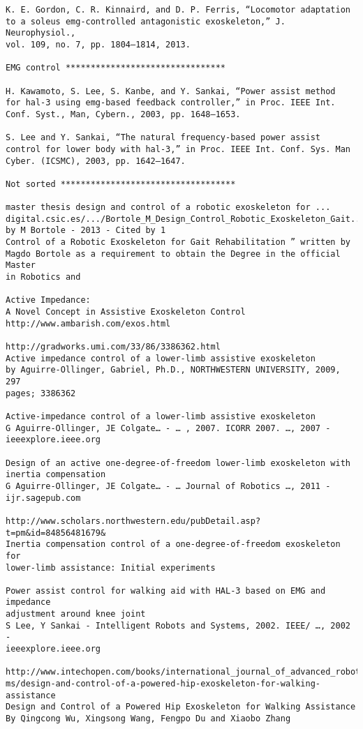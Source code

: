 \documentclass[letterpaper,12pt,fullpage]{article}
\begin{document}
\begin{verbatim}
K. E. Gordon, C. R. Kinnaird, and D. P. Ferris, “Locomotor adaptation
to a soleus emg-controlled antagonistic exoskeleton,” J. Neurophysiol.,
vol. 109, no. 7, pp. 1804–1814, 2013.

EMG control ********************************

H. Kawamoto, S. Lee, S. Kanbe, and Y. Sankai, “Power assist method
for hal-3 using emg-based feedback controller,” in Proc. IEEE Int.
Conf. Syst., Man, Cybern., 2003, pp. 1648–1653.

S. Lee and Y. Sankai, “The natural frequency-based power assist
control for lower body with hal-3,” in Proc. IEEE Int. Conf. Sys. Man
Cyber. (ICSMC), 2003, pp. 1642–1647.

Not sorted ***********************************

master thesis design and control of a robotic exoskeleton for ...
digital.csic.es/.../Bortole_M_Design_Control_Robotic_Exoskeleton_Gait...
by M Bortole - ‎2013 - ‎Cited by 1
Control of a Robotic Exoskeleton for Gait Rehabilitation ” written by
Magdo Bortole as a requirement to obtain the Degree in the official Master
in Robotics and

Active Impedance:
A Novel Concept in Assistive Exoskeleton Control
http://www.ambarish.com/exos.html

http://gradworks.umi.com/33/86/3386362.html
Active impedance control of a lower-limb assistive exoskeleton
by Aguirre-Ollinger, Gabriel, Ph.D., NORTHWESTERN UNIVERSITY, 2009, 297
pages; 3386362

Active-impedance control of a lower-limb assistive exoskeleton
G Aguirre-Ollinger, JE Colgate… - … , 2007. ICORR 2007. …, 2007 -
ieeexplore.ieee.org

Design of an active one-degree-of-freedom lower-limb exoskeleton with
inertia compensation
G Aguirre-Ollinger, JE Colgate… - … Journal of Robotics …, 2011 -
ijr.sagepub.com

http://www.scholars.northwestern.edu/pubDetail.asp?t=pm&id=84856481679&
Inertia compensation control of a one-degree-of-freedom exoskeleton for
lower-limb assistance: Initial experiments

Power assist control for walking aid with HAL-3 based on EMG and impedance
adjustment around knee joint
S Lee, Y Sankai - Intelligent Robots and Systems, 2002. IEEE/ …, 2002 -
ieeexplore.ieee.org

http://www.intechopen.com/books/international_journal_of_advanced_robotic_syste\
ms/design-and-control-of-a-powered-hip-exoskeleton-for-walking-assistance
Design and Control of a Powered Hip Exoskeleton for Walking Assistance
By Qingcong Wu, Xingsong Wang, Fengpo Du and Xiaobo Zhang


\end{verbatim}
\end{document}
